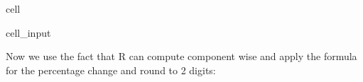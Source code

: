 \documentclass[letterpaper,10pt,english]{jupyterBook}
\begin{document}
\begin{sphinxuseclass}{cell}\begin{sphinxVerbatimInput}

\begin{sphinxuseclass}{cell_input}
\begin{sphinxVerbatim}[commandchars=\\\{\}]
\end{sphinxVerbatim}

\end{sphinxuseclass}\end{sphinxVerbatimInput}

\end{sphinxuseclass}
\sphinxAtStartPar
Now we use the fact that R can compute component wise and apply the formula for the percentage change and round to 2 digits:
\end{document}
